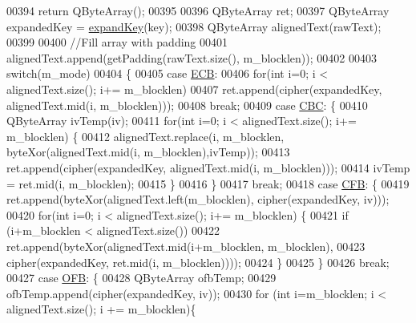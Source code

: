 \begin{DoxyCode}
00394        \textcolor{keywordflow}{return} QByteArray();
00395 
00396     QByteArray ret;
00397     QByteArray expandedKey = \hyperlink{class_q_a_e_s_encryption_a5bfbb972f84a8376fceed648553c0912}{expandKey}(key);
00398     QByteArray alignedText(rawText);
00399 
00400     \textcolor{comment}{//Fill array with padding}
00401     alignedText.append(getPadding(rawText.size(), m\_blocklen));
00402 
00403     \textcolor{keywordflow}{switch}(m\_mode)
00404     \{
00405     \textcolor{keywordflow}{case} \hyperlink{class_q_a_e_s_encryption_ad3e031c49a3d56566379d75b40b7b255a4ca7f51778e2adf1f464164a0ba8e75e}{ECB}:
00406         \textcolor{keywordflow}{for}(\textcolor{keywordtype}{int} i=0; i < alignedText.size(); i+= m\_blocklen)
00407             ret.append(cipher(expandedKey, alignedText.mid(i, m\_blocklen)));
00408         \textcolor{keywordflow}{break};
00409     \textcolor{keywordflow}{case} \hyperlink{class_q_a_e_s_encryption_ad3e031c49a3d56566379d75b40b7b255a559bffc55d3599d0a172cc85aed98966}{CBC}: \{
00410             QByteArray ivTemp(iv);
00411             \textcolor{keywordflow}{for}(\textcolor{keywordtype}{int} i=0; i < alignedText.size(); i+= m\_blocklen) \{
00412                 alignedText.replace(i, m\_blocklen, byteXor(alignedText.mid(i, m\_blocklen),ivTemp));
00413                 ret.append(cipher(expandedKey, alignedText.mid(i, m\_blocklen)));
00414                 ivTemp = ret.mid(i, m\_blocklen);
00415             \}
00416         \}
00417         \textcolor{keywordflow}{break};
00418     \textcolor{keywordflow}{case} \hyperlink{class_q_a_e_s_encryption_ad3e031c49a3d56566379d75b40b7b255ae5e2e019df35c7d172fcd7f0ebec5e8e}{CFB}: \{
00419             ret.append(byteXor(alignedText.left(m\_blocklen), cipher(expandedKey, iv)));
00420             \textcolor{keywordflow}{for}(\textcolor{keywordtype}{int} i=0; i < alignedText.size(); i+= m\_blocklen) \{
00421                 \textcolor{keywordflow}{if} (i+m\_blocklen < alignedText.size())
00422                     ret.append(byteXor(alignedText.mid(i+m\_blocklen, m\_blocklen),
00423                                        cipher(expandedKey, ret.mid(i, m\_blocklen))));
00424             \}
00425         \}
00426         \textcolor{keywordflow}{break};
00427     \textcolor{keywordflow}{case} \hyperlink{class_q_a_e_s_encryption_ad3e031c49a3d56566379d75b40b7b255a27e2f82decd94080893d61db4a8adcb3}{OFB}: \{
00428             QByteArray ofbTemp;
00429             ofbTemp.append(cipher(expandedKey, iv));
00430             \textcolor{keywordflow}{for} (\textcolor{keywordtype}{int} i=m\_blocklen; i < alignedText.size(); i += m\_blocklen)\{

\end{DoxyCode}
